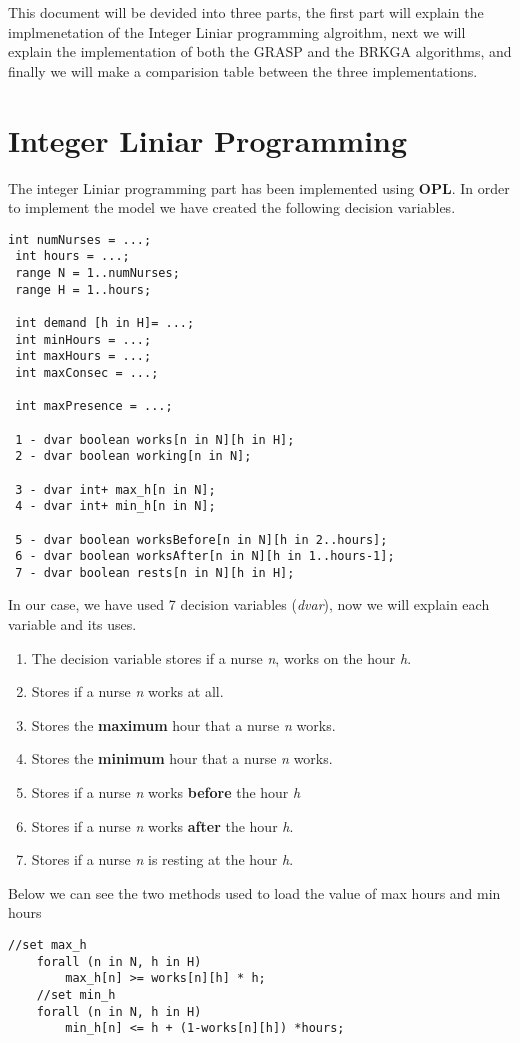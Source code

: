\documentclass[11pt]{article}
\begin{document}
This document will be devided into three parts, the first part will explain the implmenetation of the Integer Liniar programming algroithm, next we will explain the implementation of both the GRASP and the BRKGA algorithms, and finally we will make a comparision table between the three implementations.
\newpage
\section{Integer Liniar Programming}

The integer Liniar programming part has been implemented using \textbf{OPL}. In order to implement the model we have created the following decision variables.
\begin{lstlisting}[style=OPL]
 int numNurses = ...;
 int hours = ...;
 range N = 1..numNurses;
 range H = 1..hours;
 
 int demand [h in H]= ...;
 int minHours = ...;
 int maxHours = ...;
 int maxConsec = ...;
 
 int maxPresence = ...;
 
 1 - dvar boolean works[n in N][h in H]; 
 2 - dvar boolean working[n in N];
 
 3 - dvar int+ max_h[n in N];
 4 - dvar int+ min_h[n in N];

 5 - dvar boolean worksBefore[n in N][h in 2..hours];
 6 - dvar boolean worksAfter[n in N][h in 1..hours-1];
 7 - dvar boolean rests[n in N][h in H];

\end{lstlisting}
In our case, we have used 7 decision variables (\textit{dvar}), now we will explain each variable and its uses.
\newline
\begin{enumerate}
	\item The decision variable stores if a nurse \textit{n}, works on the hour \textit{h}.
	\item Stores if a nurse \textit{n} works at all.
	\item Stores the \textbf{maximum} hour that a nurse \textit{n} works.
	\item Stores the \textbf{minimum} hour that a nurse \textit{n} works.
	\item Stores if a nurse \textit{n} works \textbf{before} the hour \textit{h}
	\item Stores if a nurse \textit{n} works \textbf{after} the hour \textit{h}.
	\item Stores if a nurse \textit{n} is resting at the hour \textit{h}.
\end{enumerate}
Below we can see the two methods used to load the value of max hours and min hours
\begin{lstlisting}[style=OPL]
	//set max_h
 	forall (n in N, h in H)
 		max_h[n] >= works[n][h] * h;	
 	//set min_h
 	forall (n in N, h in H)
 		min_h[n] <= h + (1-works[n][h]) *hours;	
\end{lstlisting}
\end{document}
